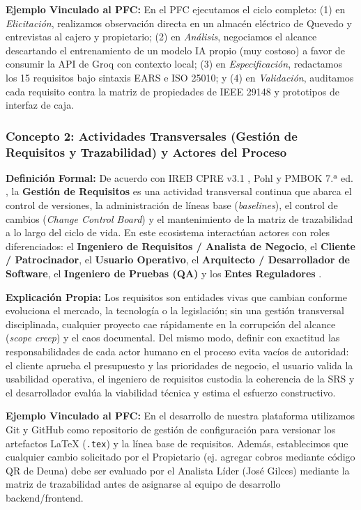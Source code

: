 \textbf{Ejemplo Vinculado al PFC:} En el PFC ejecutamos el ciclo completo: (1) en \textit{Elicitación}, realizamos observación directa en un almacén eléctrico de Quevedo y entrevistas al cajero y propietario; (2) en \textit{Análisis}, negociamos el alcance descartando el entrenamiento de un modelo IA propio (muy costoso) a favor de consumir la API de Groq con contexto local; (3) en \textit{Especificación}, redactamos los 15 requisitos bajo sintaxis EARS e ISO 25010; y (4) en \textit{Validación}, auditamos cada requisito contra la matriz de propiedades de IEEE 29148 y prototipos de interfaz de caja.

\subsubsection{Concepto 2: Actividades Transversales (Gestión de Requisitos y Trazabilidad) y Actores del Proceso}
\textbf{Definición Formal:} De acuerdo con IREB CPRE v3.1 \cite{ireb2023}, Pohl \cite{pohl2025} y PMBOK 7.ª ed. \cite{pmbok}, la \textbf{Gestión de Requisitos} es una actividad transversal continua que abarca el control de versiones, la administración de líneas base (\textit{baselines}), el control de cambios (\textit{Change Control Board}) y el mantenimiento de la matriz de trazabilidad a lo largo del ciclo de vida. En este ecosistema interactúan actores con roles diferenciados: el \textbf{Ingeniero de Requisitos / Analista de Negocio}, el \textbf{Cliente / Patrocinador}, el \textbf{Usuario Operativo}, el \textbf{Arquitecto / Desarrollador de Software}, el \textbf{Ingeniero de Pruebas (QA)} y los \textbf{Entes Reguladores} \cite{ieee29148, wiegers2013}.

\textbf{Explicación Propia:} Los requisitos son entidades vivas que cambian conforme evoluciona el mercado, la tecnología o la legislación; sin una gestión transversal disciplinada, cualquier proyecto cae rápidamente en la corrupción del alcance (\textit{scope creep}) y el caos documental. Del mismo modo, definir con exactitud las responsabilidades de cada actor humano en el proceso evita vacíos de autoridad: el cliente aprueba el presupuesto y las prioridades de negocio, el usuario valida la usabilidad operativa, el ingeniero de requisitos custodia la coherencia de la SRS y el desarrollador evalúa la viabilidad técnica y estima el esfuerzo constructivo.

\textbf{Ejemplo Vinculado al PFC:} En el desarrollo de nuestra plataforma utilizamos Git y GitHub como repositorio de gestión de configuración para versionar los artefactos LaTeX (\texttt{.tex}) y la línea base de requisitos. Además, establecimos que cualquier cambio solicitado por el Propietario (ej. agregar cobros mediante código QR de Deuna) debe ser evaluado por el Analista Líder (José Gilces) mediante la matriz de trazabilidad antes de asignarse al equipo de desarrollo backend/frontend.


